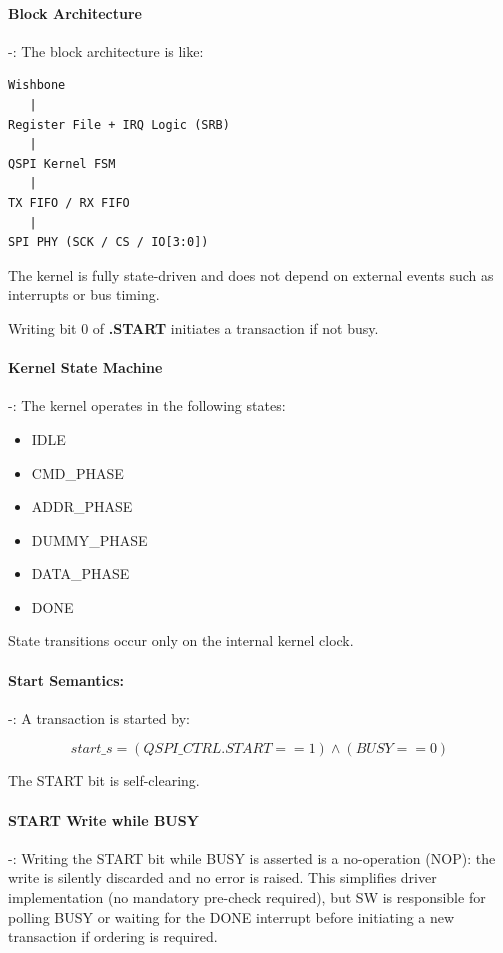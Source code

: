 \paragraph{Block Architecture} -:
The block architecture is like:
\begin{verbatim}
Wishbone
   |
Register File + IRQ Logic (SRB)
   |
QSPI Kernel FSM
   |
TX FIFO / RX FIFO
   |
SPI PHY (SCK / CS / IO[3:0])
\end{verbatim}

The kernel is fully state-driven and does not depend on external events such as interrupts or bus timing.

Writing bit 0 of \asqspiCtrlRegExt\textbf{.START} initiates a transaction if not busy.

\paragraph{Kernel State Machine} -:
The kernel operates in the following states:

\begin{itemize}
  \item IDLE
  \item CMD\_PHASE
  \item ADDR\_PHASE
  \item DUMMY\_PHASE
  \item DATA\_PHASE
  \item DONE
\end{itemize}

State transitions occur only on the internal kernel clock.

\paragraph{Start Semantics:} -:
A transaction is started by:

\[
start\_s = (QSPI\_CTRL.START == 1) \land (BUSY == 0)
\]

The START bit is self-clearing.

\paragraph{START Write while BUSY} -:
Writing the START bit while BUSY is asserted is a no-operation (NOP):
the write is silently discarded and no error is raised. This simplifies
driver implementation (no mandatory pre-check required), but SW is responsible
for polling BUSY or waiting for the DONE interrupt before initiating a
new transaction if ordering is required.


